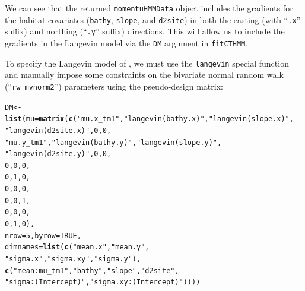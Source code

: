 \documentclass[12pt]{article}\usepackage[]{graphicx}\usepackage[]{xcolor}
\makeatletter
\newcommand{\hlnum}[1]{\textcolor[rgb]{0.686,0.059,0.569}{#1}}%
\newcommand{\hlstr}[1]{\textcolor[rgb]{0.192,0.494,0.8}{#1}}%
\newcommand{\hlstd}[1]{\textcolor[rgb]{0.345,0.345,0.345}{#1}}%
\newcommand{\hlkwb}[1]{\textcolor[rgb]{0.69,0.353,0.396}{#1}}%
\newcommand{\hlkwc}[1]{\textcolor[rgb]{0.333,0.667,0.333}{#1}}%
\newcommand{\hlkwd}[1]{\textcolor[rgb]{0.737,0.353,0.396}{\textbf{#1}}}%
\newenvironment{kframe}{%
 \def\at@end@of@kframe{}%
 \ifinner\ifhmode%
  \def\at@end@of@kframe{\end{minipage}}%
  \begin{minipage}{\columnwidth}%
 \fi\fi%
 \def\FrameCommand##1{\hskip\@totalleftmargin \hskip-\fboxsep
 \colorbox{shadecolor}{##1}\hskip-\fboxsep
     \hskip-\linewidth \hskip-\@totalleftmargin \hskip\columnwidth}%
 \MakeFramed {\advance\hsize-\width
   \@totalleftmargin\z@ \linewidth\hsize
   \@setminipage}}%
 {\par\unskip\endMakeFramed%
 \at@end@of@kframe}
\newenvironment{knitrout}{}{} %
\makeatother
\begin{document}
\noindent We can see that the returned \verb|momentuHMMData| object includes the gradients for the habitat covariates (\verb|bathy|, \verb|slope|, and \verb|d2site|) in both the easting (with ``\verb|.x|'' suffix) and northing (``\verb|.y|'' suffix) directions. This will allow us to include the gradients in the Langevin model via the \verb|DM| argument in \verb|fitCTHMM|. 

To specify the Langevin model of \citet{MichelotEtAl2019}, we must use the \verb|langevin| special function and manually impose some constraints on the bivariate normal random walk (``\verb|rw_mvnorm2|'') parameters using the pseudo-design matrix:
\begin{knitrout}
\color{fgcolor}\begin{kframe}
\begin{alltt}
\hlstd{DM} \hlkwb{<-} \hlkwd{list}\hlstd{(}\hlkwc{mu}\hlstd{=}\hlkwd{matrix}\hlstd{(}\hlkwd{c}\hlstd{(}\hlstr{"mu.x_tm1"}\hlstd{,}\hlstr{"langevin(bathy.x)"}\hlstd{,}\hlstr{"langevin(slope.x)"}\hlstd{,}
                       \hlstr{"langevin(d2site.x)"}\hlstd{,}\hlnum{0}\hlstd{,}\hlnum{0}\hlstd{,}
                       \hlstr{"mu.y_tm1"}\hlstd{,}\hlstr{"langevin(bathy.y)"}\hlstd{,}\hlstr{"langevin(slope.y)"}\hlstd{,}
                       \hlstr{"langevin(d2site.y)"}\hlstd{,}\hlnum{0}\hlstd{,}\hlnum{0}\hlstd{,}
                                \hlnum{0}\hlstd{,}                  \hlnum{0}\hlstd{,}                  \hlnum{0}\hlstd{,}
                                          \hlnum{0}\hlstd{,}\hlnum{1}\hlstd{,}\hlnum{0}\hlstd{,}
                                \hlnum{0}\hlstd{,}                  \hlnum{0}\hlstd{,}                  \hlnum{0}\hlstd{,}
                                          \hlnum{0}\hlstd{,}\hlnum{0}\hlstd{,}\hlnum{1}\hlstd{,}
                                \hlnum{0}\hlstd{,}                  \hlnum{0}\hlstd{,}                  \hlnum{0}\hlstd{,}
                                          \hlnum{0}\hlstd{,}\hlnum{1}\hlstd{,}\hlnum{0}\hlstd{),}
                     \hlkwc{nrow}\hlstd{=}\hlnum{5}\hlstd{,}\hlkwc{byrow}\hlstd{=}\hlnum{TRUE}\hlstd{,}
                     \hlkwc{dimnames} \hlstd{=} \hlkwd{list}\hlstd{(}\hlkwd{c}\hlstd{(}\hlstr{"mean.x"}\hlstd{,}\hlstr{"mean.y"}\hlstd{,}
                                       \hlstr{"sigma.x"}\hlstd{,}\hlstr{"sigma.xy"}\hlstd{,}\hlstr{"sigma.y"}\hlstd{),}
                     \hlkwd{c}\hlstd{(}\hlstr{"mean:mu_tm1"}\hlstd{,}\hlstr{"bathy"}\hlstd{,}\hlstr{"slope"}\hlstd{,}\hlstr{"d2site"}\hlstd{,}
                       \hlstr{"sigma:(Intercept)"}\hlstd{,}\hlstr{"sigma.xy:(Intercept)"}\hlstd{))))}

\end{alltt}
\end{kframe}
\end{knitrout}
\end{document}
